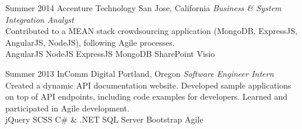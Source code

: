 \documentclass[]{friggeri-cv} %
\begin{document}
\begin{entrylist}
\entry
{Summer 2014}
{Accenture Technology}
{San Jose, California}
{\emph{Business \& System Integration Analyst} \\
Contributed to a MEAN stack crowdsourcing application (MongoDB, ExpressJS, AngularJS, NodeJS), following Agile processes. \\
AngularJS \mydot NodeJS \mydot ExpressJS \mydot MongoDB \mydot SharePoint \mydot Visio}
%
%

\entry
{Summer 2013}
{InComm Digital}
{Portland, Oregon}
{\emph{Software Engineer Intern} \\
Created a dynamic API documentation website. Developed sample applications on top of API endpoints, including code examples for developers. Learned and participated in Agile development.\\
jQuery \mydot SCSS \mydot C\# \& .NET \mydot SQL Server \mydot Bootstrap \mydot Agile}
%


\end{entrylist}
\end{document}
